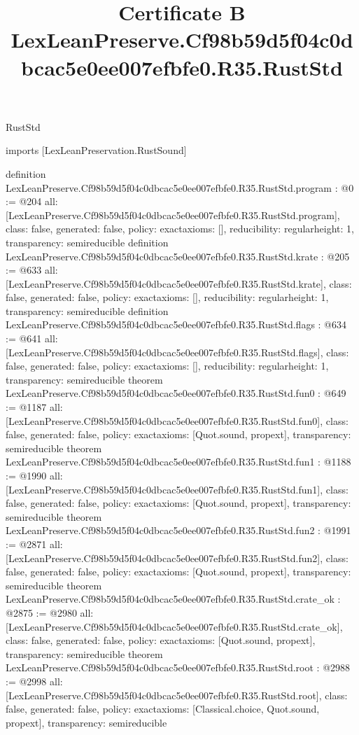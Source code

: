 \begin{lexlean}{RustStd}
\title{Certificate B LexLeanPreserve.Cf98b59d5f04c0dbcac5e0ee007efbfe0.R35.RustStd}
\begin{coremodule}
imports [LexLeanPreservation.RustSound]

definition LexLeanPreserve.Cf98b59d5f04c0dbcac5e0ee007efbfe0.R35.RustStd.program : @0 := @204 {
  all: [LexLeanPreserve.Cf98b59d5f04c0dbcac5e0ee007efbfe0.R35.RustStd.program],
  class: false,
  generated: false,
  policy: exact{axioms: []},
  reducibility: regular{height: 1},
  transparency: semireducible
}
definition LexLeanPreserve.Cf98b59d5f04c0dbcac5e0ee007efbfe0.R35.RustStd.krate : @205 := @633 {
  all: [LexLeanPreserve.Cf98b59d5f04c0dbcac5e0ee007efbfe0.R35.RustStd.krate],
  class: false,
  generated: false,
  policy: exact{axioms: []},
  reducibility: regular{height: 1},
  transparency: semireducible
}
definition LexLeanPreserve.Cf98b59d5f04c0dbcac5e0ee007efbfe0.R35.RustStd.flags : @634 := @641 {
  all: [LexLeanPreserve.Cf98b59d5f04c0dbcac5e0ee007efbfe0.R35.RustStd.flags],
  class: false,
  generated: false,
  policy: exact{axioms: []},
  reducibility: regular{height: 1},
  transparency: semireducible
}
theorem LexLeanPreserve.Cf98b59d5f04c0dbcac5e0ee007efbfe0.R35.RustStd.fun0 : @649 := @1187 {
  all: [LexLeanPreserve.Cf98b59d5f04c0dbcac5e0ee007efbfe0.R35.RustStd.fun0],
  class: false,
  generated: false,
  policy: exact{axioms: [Quot.sound, propext]},
  transparency: semireducible
}
theorem LexLeanPreserve.Cf98b59d5f04c0dbcac5e0ee007efbfe0.R35.RustStd.fun1 : @1188 := @1990 {
  all: [LexLeanPreserve.Cf98b59d5f04c0dbcac5e0ee007efbfe0.R35.RustStd.fun1],
  class: false,
  generated: false,
  policy: exact{axioms: [Quot.sound, propext]},
  transparency: semireducible
}
theorem LexLeanPreserve.Cf98b59d5f04c0dbcac5e0ee007efbfe0.R35.RustStd.fun2 : @1991 := @2871 {
  all: [LexLeanPreserve.Cf98b59d5f04c0dbcac5e0ee007efbfe0.R35.RustStd.fun2],
  class: false,
  generated: false,
  policy: exact{axioms: [Quot.sound, propext]},
  transparency: semireducible
}
theorem LexLeanPreserve.Cf98b59d5f04c0dbcac5e0ee007efbfe0.R35.RustStd.crate_ok : @2875 := @2980 {
  all: [LexLeanPreserve.Cf98b59d5f04c0dbcac5e0ee007efbfe0.R35.RustStd.crate_ok],
  class: false,
  generated: false,
  policy: exact{axioms: [Quot.sound, propext]},
  transparency: semireducible
}
theorem LexLeanPreserve.Cf98b59d5f04c0dbcac5e0ee007efbfe0.R35.RustStd.root : @2988 := @2998 {
  all: [LexLeanPreserve.Cf98b59d5f04c0dbcac5e0ee007efbfe0.R35.RustStd.root],
  class: false,
  generated: false,
  policy: exact{axioms: [Classical.choice, Quot.sound, propext]},
  transparency: semireducible
}


\end{coremodule}
\end{lexlean}
